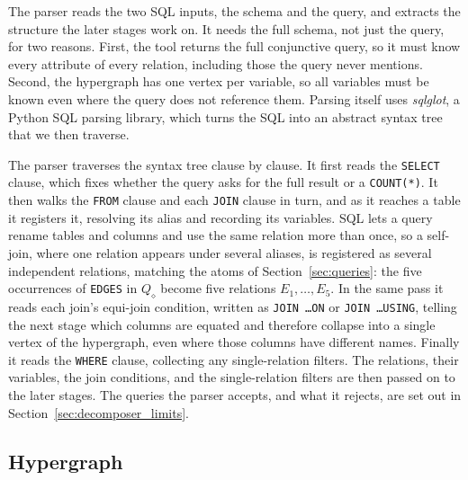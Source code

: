 The parser reads the two SQL inputs, the schema and the query, and extracts the structure the later stages work on.
It needs the full schema, not just the query, for two reasons.
First, the tool returns the full conjunctive query, so it must know every attribute of every relation, including those the query never mentions.
Second, the hypergraph has one vertex per variable, so all variables must be known even where the query does not reference them.
Parsing itself uses \emph{sqlglot}, a Python SQL parsing library, which turns the SQL into an abstract syntax tree that we then traverse.

The parser traverses the syntax tree clause by clause.
It first reads the \texttt{SELECT} clause, which fixes whether the query asks for the full result or a \texttt{COUNT(*)}.
It then walks the \texttt{FROM} clause and each \texttt{JOIN} clause in turn, and as it reaches a table it registers it, resolving its alias and recording its variables.
SQL lets a query rename tables and columns and use the same relation more than once, so a self-join, where one relation appears under several aliases, is registered as several independent relations, matching the atoms of Section~\ref{sec:queries}: the five occurrences of \texttt{EDGES} in $Q_\diamond$ become five relations $E_1,\dots,E_5$.
In the same pass it reads each join's equi-join condition, written as \texttt{JOIN \ldots ON} or \texttt{JOIN \ldots USING}, telling the next stage which columns are equated and therefore collapse into a single vertex of the hypergraph, even where those columns have different names.
Finally it reads the \texttt{WHERE} clause, collecting any single-relation filters.
The relations, their variables, the join conditions, and the single-relation filters are then passed on to the later stages.
The queries the parser accepts, and what it rejects, are set out in Section~\ref{sec:decomposer_limits}.

\subsection{Hypergraph}

